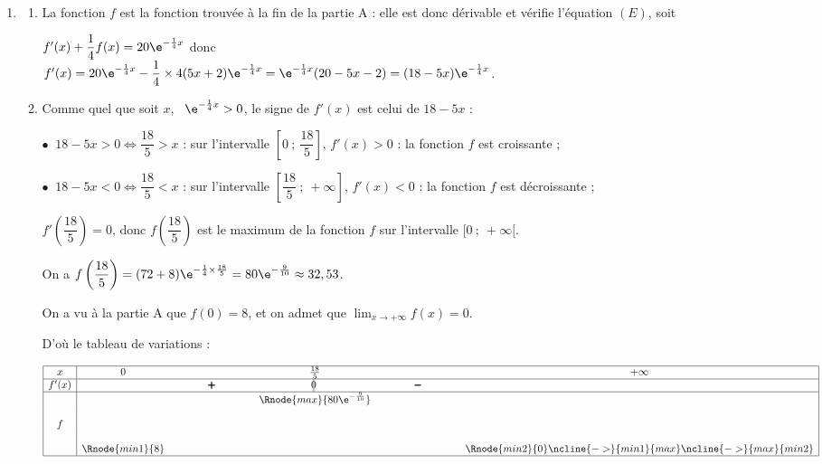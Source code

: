 \begin{enumerate}
\item 
	\begin{enumerate}
		\item %

La fonction $f$ est la fonction trouvée à la fin de la partie A : elle est donc dérivable et vérifie l'équation $(E)$, soit 

$f'(x) + \dfrac14 f(x) = 20\e^{-\frac14 x}$ donc \\
$f'(x) = 20\e^{-\frac14 x} - \dfrac14 \times 4(5x + 2)\e^{-\frac14 x} = \e^{-\frac14 x}(20 - 5x - 2) = (18 - 5x)\e^{-\frac14 x}$.

		\item %
		Comme quel que soit $x$, \, $\e^{-\frac14 x} > 0$, le signe de $f'(x)$ est celui de $18 - 5x$ :
		
$\bullet~$ $18 - 5x > 0 \iff \dfrac{18}{5} > x$ : sur l'intervalle $\left[0~;~\dfrac{18}{5}\right], \, f'(x) > 0$ : la fonction $f$ est croissante ;

$\bullet~$ $18 - 5x < 0 \iff \dfrac{18}{5} < x$ : sur l'intervalle $\left[\dfrac{18}{5}~;~+ \infty\right], \, f'(x) < 0$ : la fonction $f$ est décroissante ;

$f'\left(\dfrac{18}{5}\right) = 0$, donc $f\left(\dfrac{18}{5}\right)$ est le maximum de la fonction $f$ sur l'intervalle $[0~;~ +\infty[$.

On a $f\left(\dfrac{18}{5}\right) = (72 + 8)\e^{-\frac14 \times \frac{18}{5}} = 80\e^{-\frac{9}{10}} \approx 32,53$.

On a vu à la partie A que $f(0) = 8$, et on admet que $\displaystyle\lim_{x \to + \infty}f(x) = 0$. 

D'où le tableau de variations :

\begin{center}
{\renewcommand{\arraystretch}{1.3}
\def\esp{\hspace*{2.5cm}}%
\def\hauteur{20pt}%
$\begin{array}{|c|*5{c}|}
\hline
x & 0  & \esp & \frac{18}{5} & \esp & +\infty \\ 
\hline
f'(x) &  &   \pmb{+} & \vline\hspace{-2.7pt}0 & \pmb{-} & \\ 
\hline
 & &  &   \Rnode{max}{80 \e^{-\frac{9}{10}}}  &  &   \\  
f & &     &  &  &  \rule{0pt}{\hauteur} \\ 
 & \Rnode{min1}{8} &   &  &  &   \Rnode{min2}{0} \rule{0pt}{\hauteur}    
 \ncline{->}{min1}{max} 
 \ncline{->}{max}{min2} 
 \\ 
\hline
\end{array} $
}
\end{center}	


\end{enumerate}
\end{enumerate}

